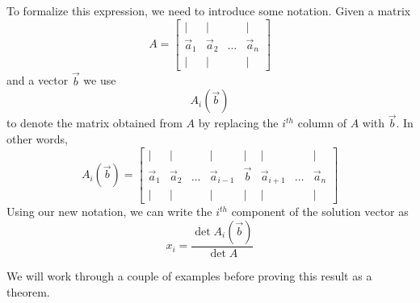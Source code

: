 \documentclass{ximera}
\begin{document}
To formalize this expression, we need to introduce some notation.  Given a matrix 
$$A=\begin{bmatrix}
           | & |& &|\\
		\vec{a}_1 & \vec{a}_2&\dots &\vec{a}_n\\
		| & |& &|
         \end{bmatrix}$$ 
and a vector $\vec{b}$ we use 
$$A_i(\vec{b})$$
to denote the matrix obtained from $A$ by replacing the $i^{th}$ column of $A$ with $\vec{b}$. In other words,
\begin{equation}\label{eq:AiNotation}
A_i(\vec{b})=\begin{bmatrix}
           | & |& &|&|&|&&|\\
		\vec{a}_1 & \vec{a}_2&\dots &\vec{a}_{i-1}&\vec{b}&\vec{a}_{i+1}&\dots&\vec{a}_n\\
		| & |& &|&|&|&&|
         \end{bmatrix}
\end{equation}
Using our new notation, we can write the $i^{th}$ component of the solution vector as
$$x_i=\frac{\det{A_i(\vec{b})}}{\det{A}}$$

We will work through a couple of examples before proving this result as a theorem.
\end{document}
